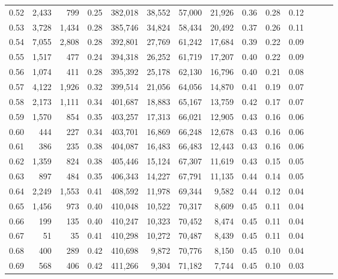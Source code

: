 \begin{tabular}{rrrrrrrrrrrrrr}
0.52 &   2,433 &    799 &  0.25 &  382,018 &   38,552 &  57,000 &  21,926 &  0.36 &  0.28 &      0.12 \\
0.53 &   3,728 &  1,434 &  0.28 &  385,746 &   34,824 &  58,434 &  20,492 &  0.37 &  0.26 &      0.11 \\
0.54 &   7,055 &  2,808 &  0.28 &  392,801 &   27,769 &  61,242 &  17,684 &  0.39 &  0.22 &      0.09 \\
0.55 &   1,517 &    477 &  0.24 &  394,318 &   26,252 &  61,719 &  17,207 &  0.40 &  0.22 &      0.09 \\
0.56 &   1,074 &    411 &  0.28 &  395,392 &   25,178 &  62,130 &  16,796 &  0.40 &  0.21 &      0.08 \\
0.57 &   4,122 &  1,926 &  0.32 &  399,514 &   21,056 &  64,056 &  14,870 &  0.41 &  0.19 &      0.07 \\
0.58 &   2,173 &  1,111 &  0.34 &  401,687 &   18,883 &  65,167 &  13,759 &  0.42 &  0.17 &      0.07 \\
0.59 &   1,570 &    854 &  0.35 &  403,257 &   17,313 &  66,021 &  12,905 &  0.43 &  0.16 &      0.06 \\
0.60 &     444 &    227 &  0.34 &  403,701 &   16,869 &  66,248 &  12,678 &  0.43 &  0.16 &      0.06 \\
0.61 &     386 &    235 &  0.38 &  404,087 &   16,483 &  66,483 &  12,443 &  0.43 &  0.16 &      0.06 \\
0.62 &   1,359 &    824 &  0.38 &  405,446 &   15,124 &  67,307 &  11,619 &  0.43 &  0.15 &      0.05 \\
0.63 &     897 &    484 &  0.35 &  406,343 &   14,227 &  67,791 &  11,135 &  0.44 &  0.14 &      0.05 \\
0.64 &   2,249 &  1,553 &  0.41 &  408,592 &   11,978 &  69,344 &   9,582 &  0.44 &  0.12 &      0.04 \\
0.65 &   1,456 &    973 &  0.40 &  410,048 &   10,522 &  70,317 &   8,609 &  0.45 &  0.11 &      0.04 \\
0.66 &     199 &    135 &  0.40 &  410,247 &   10,323 &  70,452 &   8,474 &  0.45 &  0.11 &      0.04 \\
0.67 &      51 &     35 &  0.41 &  410,298 &   10,272 &  70,487 &   8,439 &  0.45 &  0.11 &      0.04 \\
0.68 &     400 &    289 &  0.42 &  410,698 &    9,872 &  70,776 &   8,150 &  0.45 &  0.10 &      0.04 \\
0.69 &     568 &    406 &  0.42 &  411,266 &    9,304 &  71,182 &   7,744 &  0.45 &  0.10 &      0.03 \\

\end{tabular}
